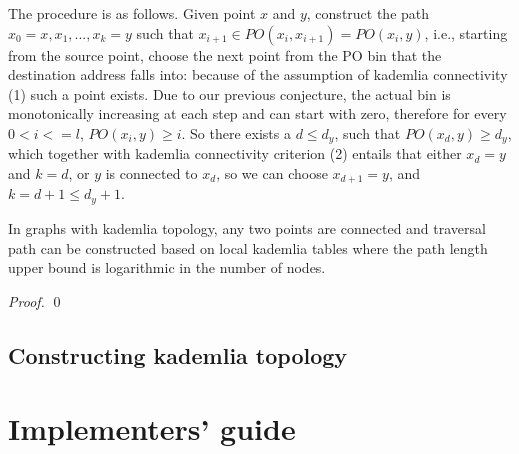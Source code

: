 The procedure is as follows. Given point $x$ and $y$, construct the path $x_0=x , x_1, ..., x_k=y$ such that $x_{i+1}\in \mathit{PO}(x_i, x_{i+1})=\mathit{PO}(x_i, y)$, i.e., starting from the source point, choose the next point from the PO bin that the destination address falls into: because of the assumption of kademlia connectivity (1) such a point exists. Due to our previous conjecture, the actual bin is monotonically increasing at each step and can start with zero, therefore for every $0<i<=l$, $\mathit{PO}(x_{i}, y)\geq i$. So there exists a $d\leq d_y$, such that 
$\mathit{PO}(x_{d}, y)\geq d_y$, which together with kademlia connectivity criterion (2) entails that either $x_d=y$ and $k=d$, or $y$ is connected to $x_d$, so we can choose $x_{d+1}=y$, and $k=d+1\leq d_y+1$.

\begin{theorem}{In graphs with kademlia topology, any two points are connected and traversal path can be constructed based on local kademlia tables where the path length upper bound is logarithmic in the number of nodes.}

\begin{proof}



\qed
\end{proof}
\end{theorem}

\section{Constructing kademlia topology}


\chapter{Implementers' guide}

